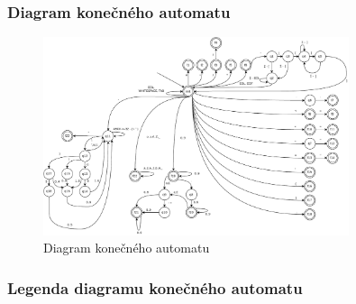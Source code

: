 \documentclass[a4paper, 12pt]{article}
\begin{document}
\newpage

\subsubsection{Diagram konečného automatu}
\begin{figure}[ht!]
\begin{center}
  \includegraphics[angle=90,origin=c, width=0.8\textwidth]{images/IFJ2021_FSM_final.pdf}
  \caption{Diagram konečného automatu}
\end{center}
\end{figure}

\subsubsection{Legenda diagramu konečného automatu}
\end{document}
